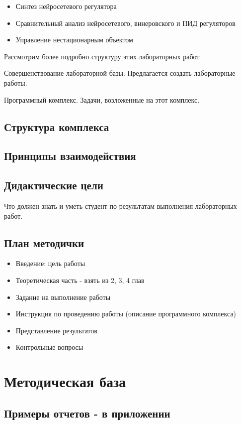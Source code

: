 \begin{itemize}
\item Синтез нейросетевого регулятора
\item Сравнительный анализ нейросетевого, винеровского и ПИД регуляторов
\item Управление нестационарным объектом
\end{itemize}

Рассмотрим более подробно структуру этих лабораторных работ

Совершенствование лабораторной базы.  Предлагается создать лабораторные работы.

Программный комплекс.
Задачи, возложенные на этот комплекс.

\subsection{Структура комплекса}
\subsection{Принципы взаимодействия}

\subsection{Дидактические цели}
Что должен знать и уметь студент по результатам выполнения лабораторных работ.

\subsection{План методички}
\begin{itemize}
\item Введение: цель работы
\item Теоретическая часть - взять из 2, 3, 4 глав
\item Задание на выполнение работы
\item Инструкция по проведению работы (описание программного комплекса)
\item Представление результатов
\item Контрольные вопросы
\end{itemize}

\section{Методическая база}
\subsection{Примеры отчетов - в приложении}
